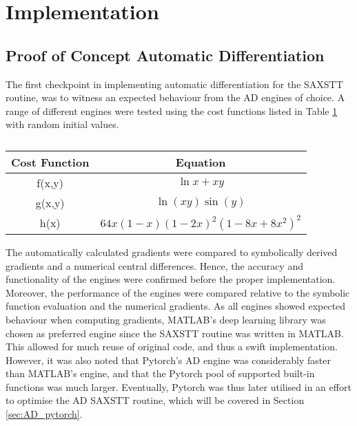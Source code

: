 
\chapter{Implementation}

\section{Proof of Concept Automatic Differentiation}\label{sec:proof_of_concept_AD}

The first checkpoint in implementing automatic differentiation for the SAXSTT routine, was to witness an expected behaviour from the AD engines of choice.
A range of different engines were tested using the cost functions listed in Table \ref{} with random initial values.

\begin{table}[h]
    \centering
    \caption{}
    \label{tab:cost_functions}
    \begin{tabular}{ c c }
        \hline
        \textbf{Cost Function} & \textbf{Equation}                \\
        \hline
        f(x,y)                 & $\ln{x} + xy$                    \\
        g(x,y)                 & $\ln(xy)\sin(y)$                 \\
        h(x)                   & $64x(1-x) (1-2x)^2(1-8x+8x^2)^2$ \\
    \end{tabular}
\end{table}



The automatically calculated gradients were compared to symbolically derived gradients and a numerical central differences.
Hence, the accuracy and functionality of the engines were confirmed before the proper implementation.
Moreover, the performance of the engines were compared relative to the symbolic function evaluation and the numerical gradients.
As all engines showed expected behaviour when computing gradients,
MATLAB's deep learning library was chosen as preferred engine since the SAXSTT routine was written in MATLAB.
This allowed for much reuse of original code, and thus a swift implementation.
However, it was also noted that Pytorch's AD engine was considerably faster than MATLAB's engine, and that the Pytorch pool of supported built-in functions was much larger.
Eventually, Pytorch was thus later utilised in an effort to optimise the AD SAXSTT routine, which will be covered in Section \ref{sec:AD_pytorch}.


